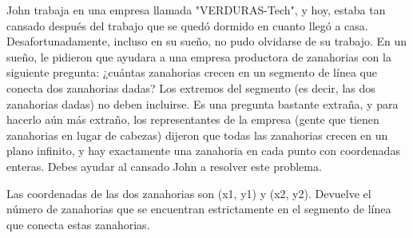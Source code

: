 John trabaja en una empresa llamada "VERDURAS-Tech", y hoy, estaba tan cansado después del trabajo que se quedó dormido en cuanto llegó a casa. Desafortunadamente, incluso en su sueño, no pudo olvidarse de su trabajo. En un sueño, le pidieron que ayudara a una empresa productora de zanahorias con la siguiente pregunta: ¿cuántas zanahorias crecen en un segmento de línea que conecta dos zanahorias dadas? Los extremos del segmento (es decir, las dos zanahorias dadas) no deben incluirse. Es una pregunta bastante extraña, y para hacerlo aún más extraño, los representantes de la empresa (gente que tienen zanahorias en lugar de cabezas) dijeron que todas las zanahorias crecen en un plano infinito, y hay exactamente una zanahoria en cada punto con coordenadas enteras. Debes ayudar al cansado John a resolver este problema.

Las coordenadas de las dos zanahorias son (x1, y1) y (x2, y2). Devuelve el número de zanahorias que se encuentran estrictamente en el segmento de línea que conecta estas zanahorias.
